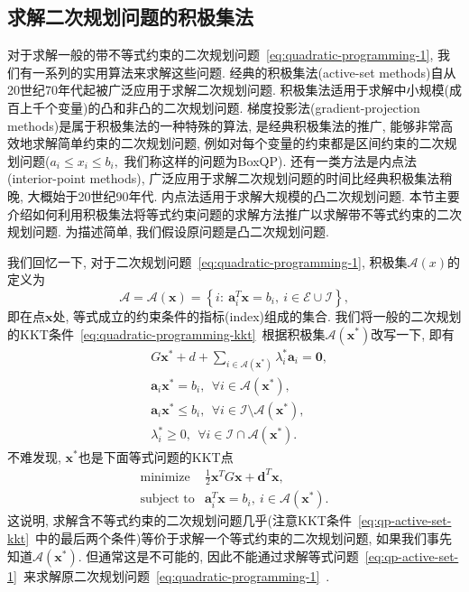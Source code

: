 \documentclass{SBCbookchapter}
\newcommand{\V}[1]{{\bm{#1}}}
\numberwithin{equation}{section}
\begin{document}
\subsection{求解二次规划问题的积极集法}
\label{subsec:7.2.2}

对于求解一般的带不等式约束的二次规划问题~\eqref{eq:quadratic-programming-1}, 我们有一系列的实用算法来求解这些问题. 经典的积极集法(active-set methods)自从20世纪70年代起被广泛应用于求解二次规划问题. 积极集法适用于求解中小规模(成百上千个变量)的凸和非凸的二次规划问题. 梯度投影法(gradient-projection methods)是属于积极集法的一种特殊的算法, 是经典积极集法的推广, 能够非常高效地求解简单约束的二次规划问题, 例如对每个变量的约束都是区间约束的二次规划问题($a_i \leqslant x_i \leqslant b_i,$ 我们称这样的问题为BoxQP). 还有一类方法是内点法(interior-point methods), 广泛应用于求解二次规划问题的时间比经典积极集法稍晚, 大概始于20世纪90年代. 内点法适用于求解大规模的凸二次规划问题. 本节主要介绍如何利用积极集法将等式约束问题的求解方法推广以求解带不等式约束的二次规划问题. 为描述简单, 我们假设原问题是凸二次规划问题.

我们回忆一下, 对于二次规划问题~\eqref{eq:quadratic-programming-1}, 积极集$\mathcal{A}(x)$的定义为
\begin{equation}
\label{eq:qp-active-set}
\mathcal{A} = \mathcal{A}(\V{x}) = \left\{ i : ~ \V{a}_i^T \V{x} = b_i, ~ i \in \mathcal{E} \cup \mathcal{I} \right\},
\end{equation}
即在点$\V{x}$处, 等式成立的约束条件的指标(index)组成的集合. 我们将一般的二次规划的KKT条件~\eqref{eq:quadratic-programming-kkt}~根据积极集$\mathcal{A}(\V{x}^*)$改写一下, 即有
\begin{equation}
\label{eq:qp-active-set-kkt}
\begin{aligned}
& G \V{x}^* + d + \sum\limits_{i \in \mathcal{A}(\V{x}^*)} \lambda_i^* \V{a}_i = \V{0}, \\
& \V{a}_i \V{x}^* = b_i, ~~ \forall i \in \mathcal{A}(\V{x}^*), \\
& \V{a}_i \V{x}^* \leqslant b_i, ~~ \forall i \in \mathcal{I} \setminus \mathcal{A}(\V{x}^*), \\
& \lambda_i^* \geqslant 0, ~~ \forall i \in \mathcal{I} \cap \mathcal{A}(\V{x}^*).
\end{aligned}
\end{equation}
不难发现, $\V{x}^*$也是下面等式问题的KKT点
\begin{equation}
\label{eq:qp-active-set-1}
\begin{array}{cl}
\text{minimize} & \frac{1}{2} \V{x}^T G \V{x} + \V{d}^T \V{x}, \\
\text{subject to} & \V{a}_i^T \V{x} = b_i, ~ i \in \mathcal{A}(\V{x}^*).
\end{array}
\end{equation}
这说明, 求解含不等式约束的二次规划问题几乎(注意KKT条件~\eqref{eq:qp-active-set-kkt}~中的最后两个条件)等价于求解一个等式约束的二次规划问题, 如果我们事先知道$\mathcal{A}(\V{x}^*).$ 但通常这是不可能的, 因此不能通过求解等式问题~\eqref{eq:qp-active-set-1}~来求解原二次规划问题~\eqref{eq:quadratic-programming-1}~.
\end{document}
